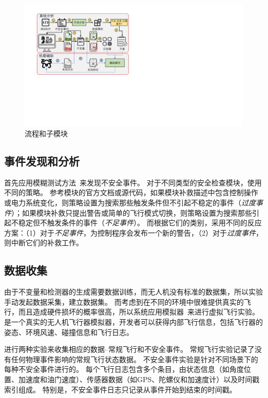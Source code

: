 \begin{figure}[ht]
   \centering
    \includegraphics[width=\linewidth]{fig/check/overview_check.pdf}
\caption{\deccheck 流程和子模块}
\label{fig:check_overview} 
\end{figure}


\subsection{事件发现和分析}
\deccheck 首先应用模糊测试方法~\cite{choi2020cyber}来发现不安全事件。
对于不同类型的安全检查模块，\deccheck 使用不同的策略。
参考模块的官方文档或源代码，如果模块补救描述中包含控制操作或电力系统变化，则策略设置为搜索那些触发条件但不引起不稳定的事件（\emph{过度事件}）；如果模块补救只提出警告或简单的飞行模式切换，则策略设置为搜索那些引起不稳定但不触发条件的事件（\emph{不足事件}）。
而根据它们的类别，\deccheck 采用不同的反应方案：（1）对于\emph{不足事件}，\deccheck 为控制程序会发布一个新的警告，（2）对于\emph{过度事件}，\deccheck 则中断它们的补救工作。


\subsection{数据收集}
由于不变量和检测器的生成需要数据训练，而无人机没有标准的数据集，所以实验手动发起数据采集，建立数据集。
而考虑到在不同的环境中很难提供真实的飞行，而且造成硬件损坏的概率很高，所以系统应用模拟器~\cite{airsim2017fsr}来进行虚拟飞行实验。
是一个真实的无人机飞行器模拟器，开发者可以获得内部飞行信息，包括飞行器的姿态、环境风速、碰撞信息和飞行日志。

\deccheck 进行两种实验来收集相应的数据--常规飞行和不安全事件。
常规飞行实验记录了没有任何物理事件影响的常规飞行状态数据。
不安全事件实验是针对不同场景下的每种不安全事件进行的。
每个飞行日志包含多个条目，由状态信息（如角度位置、加速度和油门速度）、传感器数据（如GPS、陀螺仪和加速度计）以及时间戳索引组成。
特别是，不安全事件日志只记录从事件开始到结束的时间戳。


